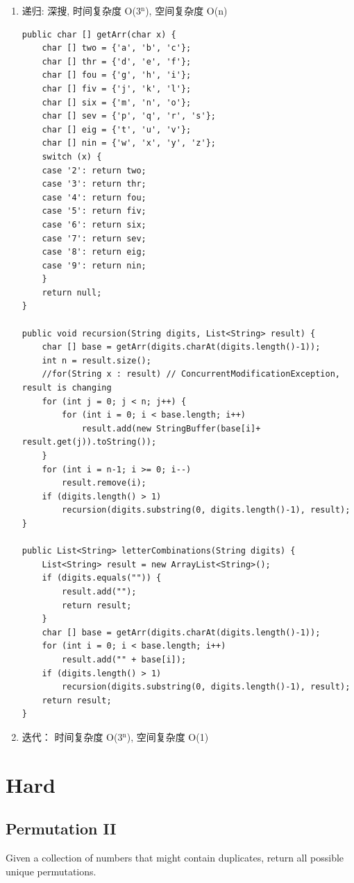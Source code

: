 \documentclass[12pt]{book}
\begin{document}
\begin{enumerate}
\item 递归: 深搜, 时间复杂度 O(3$^{\text{n}}$), 空间复杂度 O(n)
\label{sec-9-1-5-1}

\lstset{language=java,label= ,caption= ,numbers=none}
\begin{lstlisting}
public char [] getArr(char x) {
    char [] two = {'a', 'b', 'c'};
    char [] thr = {'d', 'e', 'f'};
    char [] fou = {'g', 'h', 'i'};
    char [] fiv = {'j', 'k', 'l'};
    char [] six = {'m', 'n', 'o'};
    char [] sev = {'p', 'q', 'r', 's'};
    char [] eig = {'t', 'u', 'v'};
    char [] nin = {'w', 'x', 'y', 'z'};
    switch (x) {
    case '2': return two;
    case '3': return thr;
    case '4': return fou;
    case '5': return fiv;
    case '6': return six;
    case '7': return sev;
    case '8': return eig;
    case '9': return nin;
    }
    return null;
}

public void recursion(String digits, List<String> result) {
    char [] base = getArr(digits.charAt(digits.length()-1));
    int n = result.size();
    //for(String x : result) // ConcurrentModificationException, result is changing
    for (int j = 0; j < n; j++) {
        for (int i = 0; i < base.length; i++)
            result.add(new StringBuffer(base[i]+ result.get(j)).toString());
    }
    for (int i = n-1; i >= 0; i--)
        result.remove(i);
    if (digits.length() > 1)
        recursion(digits.substring(0, digits.length()-1), result);
}
        
public List<String> letterCombinations(String digits) {
    List<String> result = new ArrayList<String>();
    if (digits.equals("")) {
        result.add("");
        return result;
    }
    char [] base = getArr(digits.charAt(digits.length()-1));
    for (int i = 0; i < base.length; i++) 
        result.add("" + base[i]);
    if (digits.length() > 1)
        recursion(digits.substring(0, digits.length()-1), result);
    return result;
}
\end{lstlisting}

\item 迭代： 时间复杂度 O(3$^{\text{n}}$), 空间复杂度 O(1)
\label{sec-9-1-5-2}
\end{enumerate}

\section{Hard}
\label{sec-9-2}
\subsection{Permutation II}
\label{sec-9-2-1}
Given a collection of numbers that might contain duplicates, return all possible unique permutations.
\end{document}

